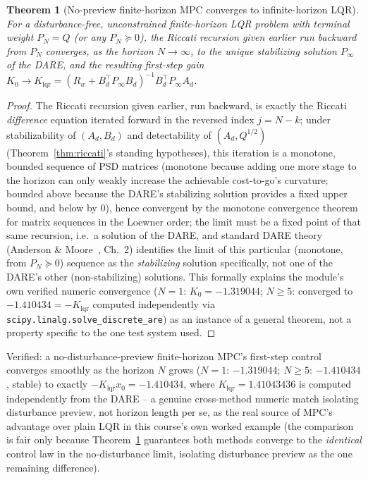 \documentclass[11pt]{report}
\theoremstyle{plain}
\newtheorem{theorem}{Theorem}[chapter]
\theoremstyle{definition}
\theoremstyle{remark}
\begin{document}
\begin{theorem}[No-preview finite-horizon MPC converges to infinite-horizon LQR]
\label{thm:mpc-lqr}
For a disturbance-free, unconstrained finite-horizon LQR problem with
terminal weight $P_N=Q$ (or any $P_N\succeq0$), the Riccati recursion
given earlier run backward from $P_N$ converges, as the
horizon $N\to\infty$, to the unique stabilizing solution $P_\infty$ of
the DARE, and the resulting first-step gain $K_0\to K_{\text{lqr}}=
(R_w+B_d^\top P_\infty B_d)^{-1}B_d^\top P_\infty A_d$.
\end{theorem}
\begin{proof}
The Riccati recursion given earlier, run backward, is
exactly the Riccati \emph{difference} equation iterated forward in the
reversed index $j=N-k$; under stabilizability of $(A_d,B_d)$ and
detectability of $(A_d,Q^{1/2})$ (Theorem~\ref{thm:riccati}'s standing
hypotheses), this iteration is a monotone, bounded sequence of PSD
matrices (monotone because adding one more stage to the horizon can only
weakly increase the achievable cost-to-go's curvature; bounded above
because the DARE's stabilizing solution provides a fixed upper bound,
and below by $0$), hence convergent by the monotone convergence theorem
for matrix sequences in the Loewner order; the limit must be a fixed
point of that same recursion, i.e.\ a solution of the DARE, and
standard DARE theory (Anderson \& Moore~\cite{andersonmoore}, Ch.~2)
identifies the limit of this particular (monotone, from $P_N\succeq0$)
sequence as the \emph{stabilizing} solution specifically, not one of the
DARE's other (non-stabilizing) solutions. This formally explains the
module's own verified numeric convergence
($N=1$: $K_0=-1.319044$; $N\ge5$: converged to $-1.410434=
-K_{\text{lqr}}$ computed independently via
\texttt{scipy.linalg.solve\_\hspace{0pt}discrete\_\hspace{0pt}are}) as an instance of a
general theorem, not a property specific to the one test system used.
\end{proof}

Verified: a no-disturbance-preview finite-horizon MPC's first-step
control converges smoothly as the horizon $N$ grows ($N=1$: $-1.319044$;
$N\ge5$: $-1.410434$, stable) to exactly $-K_{\text{lqr}}x_0=-1.410434$,
where $K_{\text{lqr}}=1.41043436$ is computed independently from the
DARE -- a genuine cross-method numeric match isolating disturbance
preview, not horizon length per se, as the real source of MPC's advantage
over plain LQR in this course's own worked example (the comparison is
fair only because Theorem~\ref{thm:mpc-lqr} guarantees both methods
converge to the \emph{identical} control law in the no-disturbance
limit, isolating disturbance preview as the one remaining difference).
\end{document}
